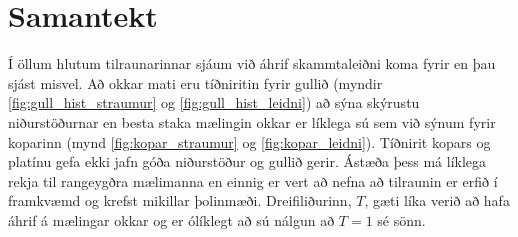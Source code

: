 \documentclass[11pt]{article}
\begin{document}
\section{Samantekt}
Í öllum hlutum tilraunarinnar sjáum við áhrif skammtaleiðni koma fyrir en þau sjást misvel. Að okkar mati eru tíðniritin fyrir gullið (myndir \ref{fig:gull_hist_straumur} og \ref{fig:gull_hist_leidni}) að sýna skýrustu niðurstöðurnar en besta staka mælingin okkar er líklega sú sem við sýnum fyrir koparinn (mynd \ref{fig:kopar_straumur} og \ref{fig:kopar_leidni}). Tíðnirit kopars og platínu gefa ekki jafn góða niðurstöður og gullið gerir. Ástæða þess má líklega rekja til rangeygðra mælimanna en einnig er vert að nefna að tilraunin er erfið í framkvæmd og krefst mikillar þolinmæði. Dreifiliðurinn, $T$, gæti líka verið að hafa áhrif á mælingar okkar og er ólíklegt að sú nálgun að $T=1$ sé sönn.
\end{document}
